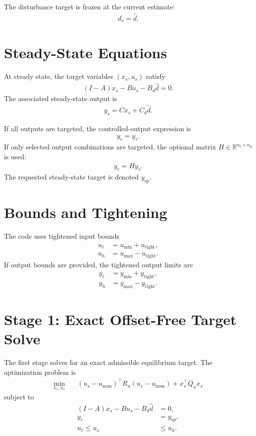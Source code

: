 \documentclass[11pt]{article}
\begin{document}
The disturbance target is frozen at the current estimate:
\begin{align}
    d_s = \hat d.
\end{align}

\section{Steady-State Equations}
At steady state, the target variables $(x_s,u_s)$ satisfy
\begin{align}
    (I - A)x_s - B u_s - B_d \hat d = 0.
\end{align}
The associated steady-state output is
\begin{align}
    y_s = C x_s + C_d \hat d.
\end{align}

If all outputs are targeted, the controlled-output expression is
\begin{align}
    y_c = y_s.
\end{align}
If only selected output combinations are targeted, the optional matrix
$H \in \mathbb{R}^{n_c \times n_y}$ is used:
\begin{align}
    y_c = H y_s.
\end{align}
The requested steady-state target is denoted $y_{\mathrm{sp}}$.

\section{Bounds and Tightening}
The code uses tightened input bounds
\begin{align}
    u_{\ell} &= u_{\min} + u_{\mathrm{tight}}, \\
    u_{h} &= u_{\max} - u_{\mathrm{tight}}.
\end{align}
If output bounds are provided, the tightened output limits are
\begin{align}
    y_{\ell} &= y_{\min} + y_{\mathrm{tight}}, \\
    y_{h} &= y_{\max} - y_{\mathrm{tight}}.
\end{align}

\section{Stage 1: Exact Offset-Free Target Solve}
The first stage solves for an exact admissible equilibrium target. The
optimization problem is
\begin{align}
    \min_{x_s,u_s} \quad & (u_s-u_{\mathrm{nom}})^\top R_u (u_s-u_{\mathrm{nom}})
    + x_s^\top Q_x x_s
\end{align}
subject to
\begin{align}
    (I-A)x_s - B u_s - B_d \hat d &= 0, \\
    y_c &= y_{\mathrm{sp}}, \\
    u_{\ell} \le u_s &\le u_h.
\end{align}
\end{document}
